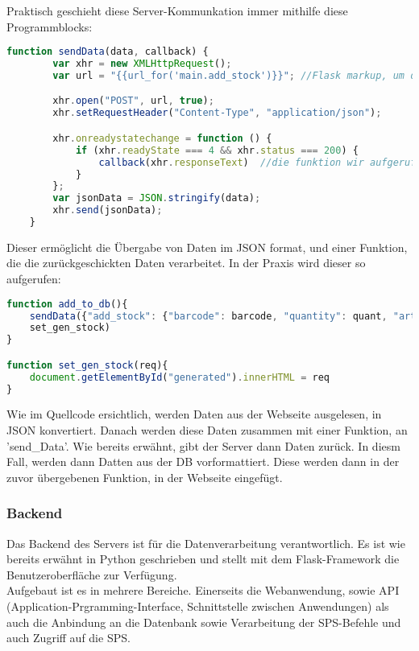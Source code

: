 Praktisch geschieht diese Server-Kommunkation immer mithilfe diese Programmblocks:

\begin{lstlisting}[language=JavaScript]
    function sendData(data, callback) {
        var xhr = new XMLHttpRequest();
        var url = "{{url_for('main.add_stock')}}"; //Flask markup, um die richtige url zu erreichen, dies wird vor ausgabe auf der Webseite noch eingesetzt

        xhr.open("POST", url, true);
        xhr.setRequestHeader("Content-Type", "application/json");

        xhr.onreadystatechange = function () {
            if (xhr.readyState === 4 && xhr.status === 200) {
                callback(xhr.responseText)  //die funktion wir aufgerufen
            }
        };
        var jsonData = JSON.stringify(data);
        xhr.send(jsonData);
    }
\end{lstlisting}

Dieser ermöglicht die Übergabe von Daten im JSON format, und einer Funktion, die die zurückgeschickten Daten verarbeitet. In der Praxis wird dieser so aufgerufen:

\begin{lstlisting}[language=JavaScript]
function add_to_db(){
    sendData({"add_stock": {"barcode": barcode, "quantity": quant, "article": article}}, 
    set_gen_stock)
}

function set_gen_stock(req){
    document.getElementById("generated").innerHTML = req
}\end{lstlisting}

Wie im Quellcode ersichtlich, werden Daten aus der Webseite ausgelesen, in JSON konvertiert. Danach werden diese Daten zusammen mit einer Funktion, an 'send\_Data'. Wie bereits erwähnt, gibt der Server dann Daten zurück. In diesm Fall, werden dann Datten aus der DB vorformattiert. Diese werden dann in der zuvor übergebenen Funktion, in der Webseite eingefügt.

\subsubsection{Backend}
Das Backend des Servers ist für die Datenverarbeitung verantwortlich. Es ist wie bereits erwähnt in Python geschrieben und stellt mit dem Flask-Framework die Benutzeroberfläche zur Verfügung. \\
Aufgebaut ist es in mehrere Bereiche. Einerseits die Webanwendung, sowie API (Application-Prgramming-Interface, Schnittstelle zwischen Anwendungen) als auch die Anbindung an die Datenbank sowie Verarbeitung der SPS-Befehle und auch Zugriff auf die SPS.

